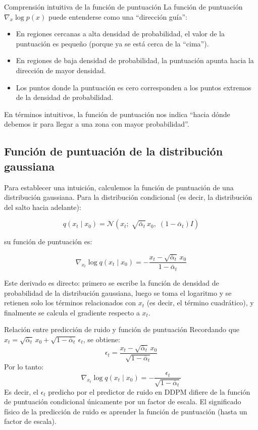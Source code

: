 \documentclass[a4paper]{article}
\begin{document}
\begin{knowledgebox}{Comprensión intuitiva de la función de puntuación}
La función de puntuación $\nabla_x \log p(x)$ puede entenderse como una ``dirección guía'':
\begin{itemize}
    \item En regiones cercanas a alta densidad de probabilidad, el valor de la puntuación es pequeño (porque ya se está cerca de la ``cima'').
    \item En regiones de baja densidad de probabilidad, la puntuación apunta hacia la dirección de mayor densidad.
    \item Los puntos donde la puntuación es cero corresponden a los puntos extremos de la densidad de probabilidad.
\end{itemize}
En términos intuitivos, la función de puntuación nos indica ``hacia dónde debemos ir para llegar a una zona con mayor probabilidad''.
\end{knowledgebox}

\subsection{Función de puntuación de la distribución gaussiana}

Para establecer una intuición, calculemos la función de puntuación de una distribución gaussiana. Para la distribución condicional (es decir, la distribución del salto hacia adelante):

$$q(x_t \mid x_0) = \mathcal{N}(x_t;\; \sqrt{\bar{\alpha}_t}\, x_0,\; (1-\bar{\alpha}_t) I)$$

su función de puntuación es:

$$\nabla_{x_t} \log q(x_t \mid x_0) = -\frac{x_t - \sqrt{\bar{\alpha}_t}\, x_0}{1-\bar{\alpha}_t}$$

Este derivado es directo: primero se escribe la función de densidad de probabilidad de la distribución gaussiana, luego se toma el logaritmo y se retienen solo los términos relacionados con $x_t$ (es decir, el término cuadrático), y finalmente se calcula el gradiente respecto a $x_t$.

\begin{importantbox}{Relación entre predicción de ruido y función de puntuación}
Recordando que $x_t = \sqrt{\bar{\alpha}_t}\, x_0 + \sqrt{1-\bar{\alpha}_t}\, \epsilon_t$, se obtiene:
$$\epsilon_t = \frac{x_t - \sqrt{\bar{\alpha}_t}\, x_0}{\sqrt{1-\bar{\alpha}_t}}$$
Por lo tanto:
$$\nabla_{x_t} \log q(x_t \mid x_0) = -\frac{\epsilon_t}{\sqrt{1-\bar{\alpha}_t}}$$
Es decir, el $\epsilon_t$ predicho por el predictor de ruido en DDPM difiere de la función de puntuación condicional únicamente por un factor de escala. El significado físico de la predicción de ruido es aprender la función de puntuación (hasta un factor de escala).
\end{importantbox}
\end{document}
